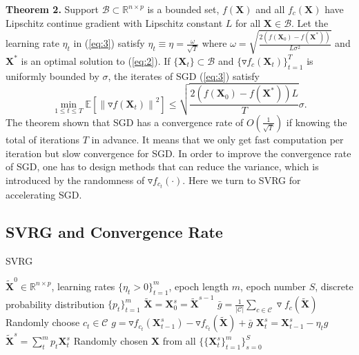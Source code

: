 \documentclass[letterpaper]{article}
\begin{document}
		\textbf{Theorem 2.} Support $\mathcal{B}\subset\mathbb{R}^{n\times p}$ is a bounded set, $f(\mathbf{X})$ and all $f_c(\mathbf{X})$ have Lipschitz continue gradient with Lipschitz constant $L$ for all $\mathbf{X}\in\mathcal{B}$. Let the learning rate $\eta_t$ in (\ref{eq:3}) satisfy $\eta_t\equiv\eta=\frac{\omega}{\sqrt{T}}$ where $\omega=\sqrt{\frac{2\left(f(\mathbf{X}_0)-f(\mathbf{X}^*)\right)}{L\sigma^2}}$ and $\mathbf{X}^*$ is an optimal solution to (\ref{eq:2}). If $\{\mathbf{X}_t\}\subset\mathcal{B}$ and $\{\triangledown f_c(\mathbf{X}_t)\}^T_{t=1}$ is uniformly bounded by $\sigma$, the iterates of SGD (\ref{eq:3}) satisfy
		$$
		\underset{1\leq t\leq T}{\min}\mathbb{E}\left[\left\|\triangledown f(\mathbf{X}_t)\right\|^2\right]\leq\sqrt{\frac{2(f(\mathbf{X}_0)-f(\mathbf{X}^*))L}{T}}\sigma.
		$$
		The theorem shown that SGD has a convergence rate of $O(\frac{1}{\sqrt{T}})$ if knowing the total of iterations $T$ in advance. It means that we only get fast computation per iteration but slow convergence for SGD. In order to improve the convergence rate of SGD, one has to design methods that can reduce the variance, which is introduced by the randomness of $\triangledown f_{c_t}(\cdot)$. Here we turn to SVRG for accelerating SGD.

		\subsection{SVRG and Convergence Rate}

		\begin{algorithm}
			\caption{SVRG}\label{alg:svrg}
			\begin{algorithmic}[1]
				\Require $\tilde{\mathbf{X}}^0\in\mathbb{R}^{n\times p}$, learning rates $\{\eta_t>0\}^{m}_{t=1}$, epoch length $m$, epoch number $S$, discrete probability distribution $\{p_t\}^m_{t=1}$
					\State $\tilde{\mathbf{X}} = \mathbf{X}^s_0 =\tilde{\mathbf{X}}^{s-1}$
					\State $\bar{g} = \frac{1}{|\mathcal{C}|}\underset{c\in\mathcal{C}}{\sum}\triangledown f_c(\tilde{\mathbf{X}})$
						\State Randomly choose $c_t\in\mathcal{C}$
						\State $g=\triangledown f_{c_t}(\mathbf{X}^s_{t-1})-\triangledown f_{c_t}(\tilde{\mathbf{X}})+\bar{g}$
						\State $\mathbf{X}^s_{t}= \mathbf{X}^s_{t-1}-\eta_t g$
					\EndFor
					\State $\tilde{\mathbf{X}}^{s}=\sum^{m}_{t}p_{t}\mathbf{X}^s_{t}$
				\EndFor
				\Ensure Randomly chosen $\mathbf{X}$ from all $\{\{\mathbf{X}^s_t\}^m_{t=1}\}^S_{s=0}$
			\end{algorithmic}
		\end{algorithm}
\end{document}

